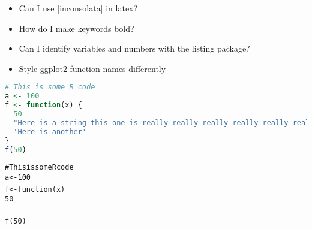 



\begin{itemize}
  \item Can I use |inconsolata| in latex?
  \item How do I make keywords bold?
  \item Can I identify variables and numbers with the listing package?
  \item Style ggplot2 function names differently
\end{itemize}



\begin{lstlisting}[language=R]
# This is some R code
a <- 100
f <- function(x) {
  50
  "Here is a string this one is really really really really really really really really really really really really long"
  'Here is another'
}
f(50)
\end{lstlisting}

\begin{alltt}
# This is some R code
a <- 100
f <- function(x) {
  50
}
f(50)
\end{alltt}

